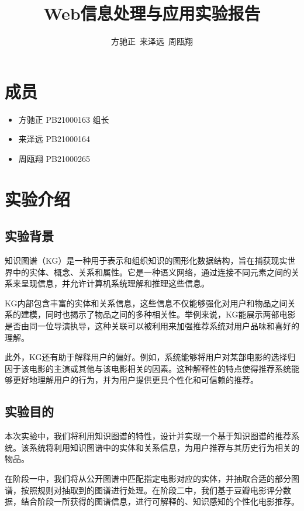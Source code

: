 \documentclass{ctexart}
\title{\textbf{Web信息处理与应用实验报告}}
\author{方驰正\ 来泽远\ 周瓯翔}
\begin{document}
\begin{sloppypar}

    \maketitle

    \section{成员}

    \begin{itemize}
        \item 方驰正 PB21000163 组长
        \item 来泽远 PB21000164
        \item 周瓯翔 PB21000265
    \end{itemize}

    \section{实验介绍}

    \subsection{实验背景}
    知识图谱（KG）是一种用于表示和组织知识的图形化数据结构，旨在捕获现实世界中的实体、概念、关系和属性。它是一种语义网络，通过连接不同元素之间的关系来呈现信息，并允许计算机系统理解和推理这些信息。

    KG内部包含丰富的实体和关系信息，这些信息不仅能够强化对用户和物品之间关系的建模，同时也揭示了物品之间的多种相关性。举例来说，KG能展示两部电影是否由同一位导演执导，这种关联可以被利用来加强推荐系统对用户品味和喜好的理解。

    此外，KG还有助于解释用户的偏好。例如，系统能够将用户对某部电影的选择归因于该电影的主演或其他与该电影相关的因素。这种解释性的特点使得推荐系统能够更好地理解用户的行为，并为用户提供更具个性化和可信赖的推荐。
    \subsection{实验目的}
    本次实验中，我们将利用知识图谱的特性，设计并实现一个基于知识图谱的推荐系统。该系统将利用知识图谱中的实体和关系信息，为用户推荐与其历史行为相关的物品。

    在阶段一中，我们将从公开图谱中匹配指定电影对应的实体，并抽取合适的部分图谱，按照规则对抽取到的图谱进行处理。在阶段二中，我们基于豆瓣电影评分数据，结合阶段一所获得的图谱信息，进行可解释的、知识感知的个性化电影推荐。


\end{sloppypar}
\end{document}
